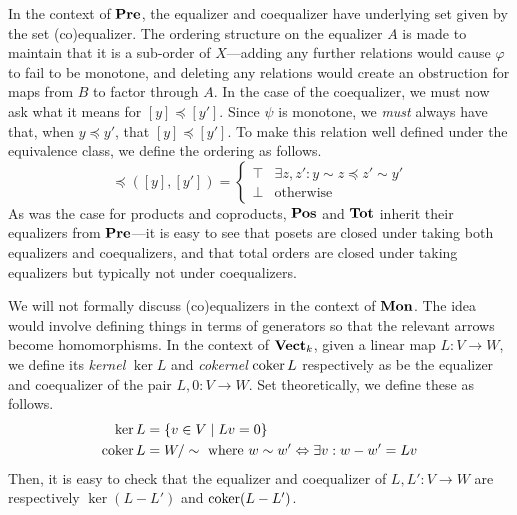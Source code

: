 In the context of $\mathbf{Pre}$, the equalizer and coequalizer have underlying set given by the set (co)equalizer. The ordering structure on the equalizer $A$ is made to maintain that it is a sub-order of $X$---adding any further relations would cause $\varphi$ to fail to be monotone, and deleting any relations would create an obstruction for maps from $B$ to factor through $A$. In the case of the coequalizer, we must now ask what it means for $[y]\preceq [y']$. Since $\psi$ is monotone, we \emph{must} always have that, when $y\preceq y'$, that $[y]\preceq[y']$. To make this relation well defined under the equivalence class, we define the ordering as follows.
\[\preceq([y],[y'])=\begin{cases} \top & \exists z,z':y\sim z\preceq z' \sim y'\\ \bot & \text{otherwise} \end{cases}\]
As was the case for products and coproducts, $\mathbf{Pos}$ and $\mathbf{Tot}$ inherit their equalizers from $\mathbf{Pre}$---it is easy to see that posets are closed under taking both equalizers and coequalizers, and that total orders are closed under taking equalizers but typically not under coequalizers.

We will not formally discuss (co)equalizers in the context of $\mathbf{Mon}$. The idea would involve defining things in terms of generators so that the relevant arrows become homomorphisms. In the context of $\mathbf{Vect}_k$, given a linear map $L:V\to W$, we define its \emph{kernel} $\ker L$ and \emph{cokernel} $\operatorname{coker} L$ respectively as be the equalizer and coequalizer of the pair $L,0:V\to W$. Set theoretically, we define these as follows.
\begin{align*}
    \ker   L & = \{v\in V\mid Lv=0\} \\
    \operatorname{coker} L & = W/\sim\text{ where } w\sim w' \Leftrightarrow \exists v:w-w'=Lv
\end{align*}
Then, it is easy to check that the equalizer and coequalizer of $L,L':V\to W$ are respectively $\ker(L-L')$ and $\operatorname{coker}(L-L')$. 

